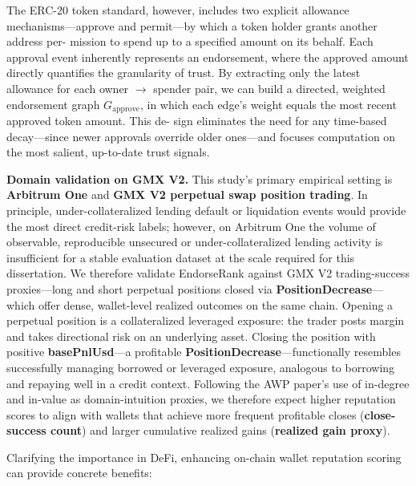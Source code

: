 The ERC-20 token standard, however, includes two explicit allowance mechanisms---approve and permit---by which a token holder grants another address per- mission to spend up to a specified amount on its behalf. Each approval event inherently represents an endorsement, where the approved amount directly quantifies the granularity of trust. By extracting only the latest allowance for each owner \(\to\) spender pair, we can build a directed, weighted endorsement graph $G_{\text{approve}}$, in which each edge's weight equals the most recent approved token amount. This de- sign eliminates the need for any time-based decay---since newer approvals override older ones---and focuses computation on the most salient, up-to-date trust signals.


\textbf{Domain validation on GMX V2.} This study's primary empirical setting is \textbf{Arbitrum One} and \textbf{GMX V2 perpetual swap position trading}. In principle, under-collateralized lending default or liquidation events would provide the most direct credit-risk labels; however, on Arbitrum One the volume of observable, reproducible unsecured or under-collateralized lending activity is insufficient for a stable evaluation dataset at the scale required for this dissertation. We therefore validate EndorseRank against GMX V2 trading-success proxies---long and short perpetual positions closed via \textbf{PositionDecrease}---which offer dense, wallet-level realized outcomes on the same chain. Opening a perpetual position is a collateralized leveraged exposure: the trader posts margin and takes directional risk on an underlying asset. Closing the position with positive \textbf{basePnlUsd}---a profitable \textbf{PositionDecrease}---functionally resembles successfully managing borrowed or leveraged exposure, analogous to borrowing and repaying well in a credit context. Following the AWP paper's use of in-degree and in-value as domain-intuition proxies, we therefore expect higher reputation scores to align with wallets that achieve more frequent profitable closes (\textbf{close-success count}) and larger cumulative realized gains (\textbf{realized gain proxy}).


Clarifying the importance in DeFi, enhancing on-chain wallet reputation scoring can provide concrete benefits:


